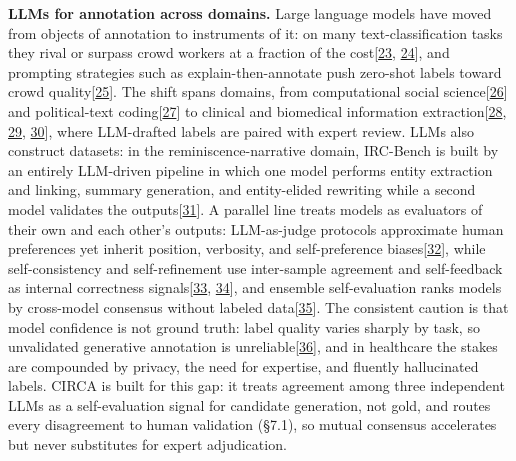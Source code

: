 \textbf{LLMs for annotation across domains.} Large language models have moved from objects of annotation to instruments of it: on many text-classification tasks they rival or surpass crowd workers at a fraction of the cost{[}\hyperref[r23]{23}, \hyperref[r24]{24}{]}, and prompting strategies such as explain-then-annotate push zero-shot labels toward crowd quality{[}\hyperref[r25]{25}{]}. The shift spans domains, from computational social science{[}\hyperref[r26]{26}{]} and political-text coding{[}\hyperref[r27]{27}{]} to clinical and biomedical information extraction{[}\hyperref[r28]{28}, \hyperref[r29]{29}, \hyperref[r30]{30}{]}, where LLM-drafted labels are paired with expert review. LLMs also construct datasets: in the reminiscence-narrative domain, IRC-Bench is built by an entirely LLM-driven pipeline in which one model performs entity extraction and linking, summary generation, and entity-elided rewriting while a second model validates the outputs{[}\hyperref[r31]{31}{]}. A parallel line treats models as evaluators of their own and each other's outputs: LLM-as-judge protocols approximate human preferences yet inherit position, verbosity, and self-preference biases{[}\hyperref[r32]{32}{]}, while self-consistency and self-refinement use inter-sample agreement and self-feedback as internal correctness signals{[}\hyperref[r33]{33}, \hyperref[r34]{34}{]}, and ensemble self-evaluation ranks models by cross-model consensus without labeled data{[}\hyperref[r35]{35}{]}. The consistent caution is that model confidence is not ground truth: label quality varies sharply by task, so unvalidated generative annotation is unreliable{[}\hyperref[r36]{36}{]}, and in healthcare the stakes are compounded by privacy, the need for expertise, and fluently hallucinated labels. CIRCA is built for this gap: it treats agreement among three independent LLMs as a self-evaluation signal for candidate generation, not gold, and routes every disagreement to human validation (§7.1), so mutual consensus accelerates but never substitutes for expert adjudication.

